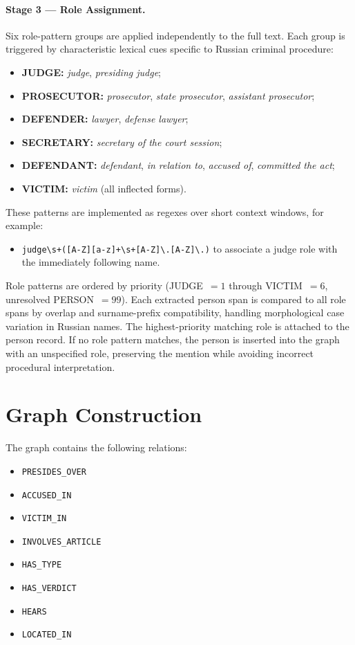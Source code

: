 \documentclass[11pt]{article}
\begin{document}
\paragraph{Stage 3 --- Role Assignment.}

Six role-pattern groups are applied independently to the full text. Each group is triggered by characteristic lexical cues specific to Russian criminal procedure:
\begin{itemize}
\item \textbf{JUDGE:} \textit{judge}, \textit{presiding judge};
\item \textbf{PROSECUTOR:} \textit{prosecutor}, \textit{state prosecutor}, \textit{assistant prosecutor};
\item \textbf{DEFENDER:} \textit{lawyer}, \textit{defense lawyer};
\item \textbf{SECRETARY:} \textit{secretary of the court session};
\item \textbf{DEFENDANT:} \textit{defendant}, \textit{in relation to}, \textit{accused of}, \textit{committed the act};
\item \textbf{VICTIM:} \textit{victim} (all inflected forms).
\end{itemize}

These patterns are implemented as regexes over short context windows, for example:
\begin{itemize}
\item \verb|judge\s+([A-Z][a-z]+\s+[A-Z]\.[A-Z]\.)| to associate a judge role with the immediately following name.
\end{itemize}

Role patterns are ordered by priority (JUDGE~$=1$ through VICTIM~$=6$, unresolved PERSON~$=99$). Each extracted person span is compared to all role spans by overlap and surname-prefix compatibility, handling morphological case variation in Russian names. The highest-priority matching role is attached to the person record. If no role pattern matches, the person is inserted into the graph with an unspecified role, preserving the mention while avoiding incorrect procedural interpretation.

\section{Graph Construction}

The graph contains the following relations:

\begin{itemize}
\item \texttt{PRESIDES\_OVER}
\item \texttt{ACCUSED\_IN}
\item \texttt{VICTIM\_IN}
\item \texttt{INVOLVES\_ARTICLE}
\item \texttt{HAS\_TYPE}
\item \texttt{HAS\_VERDICT}
\item \texttt{HEARS}
\item \texttt{LOCATED\_IN}
\end{itemize}
\end{document}
